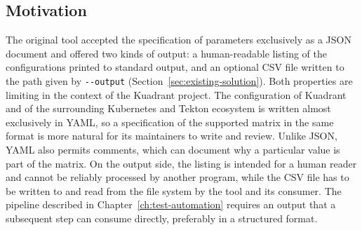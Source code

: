 \documentclass[
  digital, %
  oneside, %
  lof,     %
  nolot,     %
]{fithesis4}
\begin{document}
\subsection{Motivation}
The original tool accepted the specification of parameters exclusively as a
\gls{JSON} document and offered two kinds of output: a human-readable listing of
the configurations printed to standard output, and an optional \gls{CSV} file
written to the path given by \texttt{-{}-output}
(Section~\ref{sec:existing-solution}). Both properties are limiting in the
context of the Kuadrant project. The configuration of Kuadrant and of the
surrounding Kubernetes and Tekton ecosystem is written almost exclusively in
\gls{YAML}, so a specification of the supported matrix in the same format is
more natural for its maintainers to write and review. Unlike \gls{JSON},
\gls{YAML} also permits comments, which can document why a particular value is
part of the matrix. On the output side, the listing is intended for a human
reader and cannot be reliably processed by another program, while the \gls{CSV}
file has to be written to and read from the file system by the tool and its
consumer. The pipeline described in Chapter~\ref{ch:test-automation} requires an
output that a subsequent step can consume directly, preferably in a structured
format.
\end{document}
